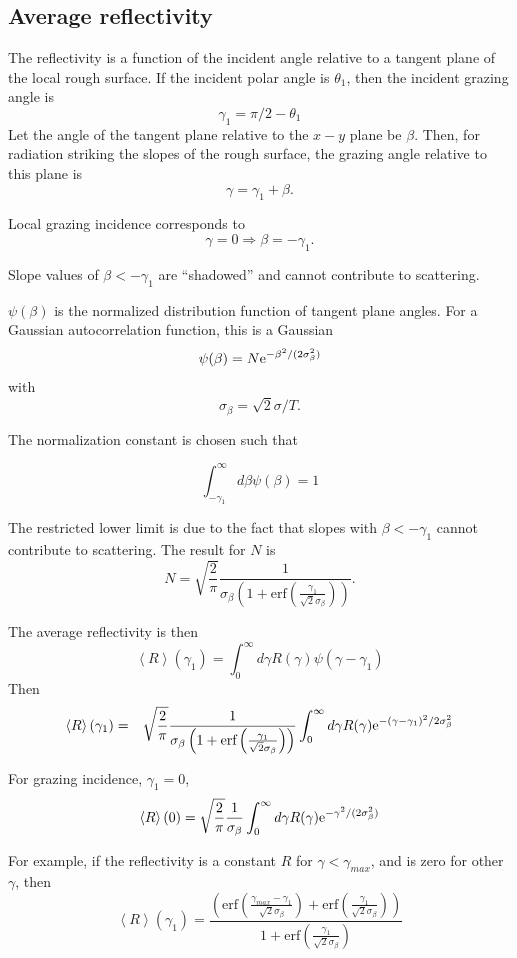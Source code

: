\documentclass[11pt]{article}
\newcommand{\e}{{\rm e}}
\begin{document}
{{{{%
\subsection{Average reflectivity}

The reflectivity is a function of the incident angle relative to a
tangent plane of the local rough surface. If the incident polar angle
is $\theta_{1}$, then the incident grazing angle is
  $$\gamma_{1}=\pi/2-\theta_{1}$$
Let the angle of the tangent plane relative to the $x-y$ plane be
$\beta$. Then, for radiation striking the slopes of the rough surface,
the grazing angle relative to this plane is
  $$\gamma=\gamma_{1}+\beta.$$

Local grazing incidence corresponds to $$\gamma=0\Rightarrow \beta=-\gamma_{1}.$$

Slope values of $\beta <-\gamma_{1}$ are ``shadowed'' and cannot contribute to scattering.

$\psi(\beta)$ is the normalized distribution function of tangent plane
angles. For a Gaussian autocorrelation function, this is a Gaussian
  $$\psi(\beta)=N\e^{-\beta^{2}/(2\sigma_{\beta}^{2})}$$
with
  $$\sigma_{\beta}=\sqrt{2}\sigma/T.$$

The normalization constant is chosen such that 

$$\int_{-\gamma_{1}}^{\infty}d\beta\psi(\beta)=1$$

The restricted lower limit is due to the fact that slopes with $\beta
<-\gamma_{1}$ cannot contribute to scattering.  The result for $N$ is
$$N=\sqrt{\frac{2}{\pi}}\frac{1}{\sigma_{\beta}
\left(1+\textrm{erf}\left(\frac{\gamma_{1}}{\sqrt{2}\sigma_{\beta}}\right)\right)}.$$

The average reflectivity is then
  $$\left<R\right>(\gamma_{1})=\int_{0}^{\infty} d\gamma R(\gamma)\psi(\gamma-\gamma_{1})$$
Then
  \begin{eqnarray}
\left<R\right>(\gamma_{1})&=&
\sqrt{\frac{2}{\pi}}\frac{1}{\sigma_{\beta}\left(1+\textrm{erf}
\left(\frac{\gamma_{1}}{\sqrt{2}\sigma_{\beta}}\right)\right)}
\int_{0}^{\infty} d\gamma R(\gamma)\e^{-(\gamma-\gamma_{1})^{2}/2\sigma_{\beta}^{2}}\\
  \end{eqnarray}


For grazing incidence, $\gamma_{1}=0$,
$$\left<R\right>(0)=
\sqrt{\frac{2}{\pi}}\frac{1}{\sigma_{\beta}}\int_{0}^{\infty} d\gamma R(\gamma)\e^{-\gamma^{2}/(2\sigma_{\beta}^{2})}$$

For example, if the reflectivity is a constant $R$ for $\gamma<\gamma_{max}$, and is zero for other $\gamma$, then
  $$\left<R\right>(\gamma_{1})=
\frac{\left(\textrm{erf}\left(\frac{\gamma_{max}-\gamma_{1}}{\sqrt{2}\sigma_{\beta}}\right)+
\textrm{erf}\left(\frac{\gamma_{1}}{\sqrt{2}\sigma_{\beta}}\right)\right)}{1+\textrm{erf}
\left(\frac{\gamma_{1}}{\sqrt{2}\sigma_{\beta}}\right)}$$

}}}}
\end{document}
